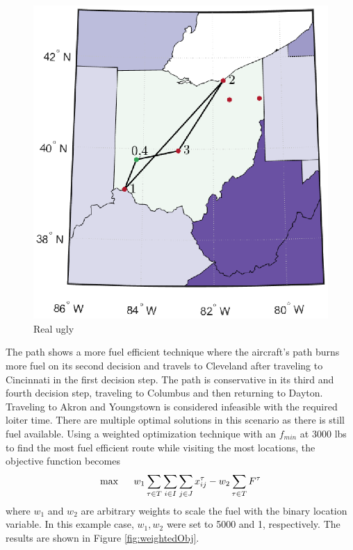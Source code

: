 \begin{figure}[H]
    \centering
    \includegraphics{Thesis/Method_II/fmin3000.eps}
    \caption{Real ugly}
    \label{fig:fmin3000}
\end{figure}
The path shows a more fuel efficient technique where the aircraft's path burns more fuel on its second decision and travels to Cleveland after traveling to Cincinnati in the first decision step. The path is conservative in its third and fourth decision step, traveling to Columbus and then returning to Dayton. Traveling to Akron and Youngstown is considered infeasible with the required loiter time. There are multiple optimal solutions in this scenario as there is still fuel available. Using a weighted optimization technique with an $f_{min}$ at $3000$ lbs to find the most fuel efficient route while visiting the most locations, the objective function becomes
\begin{equation}
    \max \hspace{.5cm} w_1\sum_{\tau\in T}\sum_{i\in I}\sum_{j\in J}x_{ij}^\tau-w_2\sum_{\tau\in T}F^\tau
\end{equation}
where $w_1$ and $w_2$ are arbitrary weights to scale the fuel with the binary location variable. In this example case, $w_1,w_2$ were set to 5000 and 1, respectively. The results are shown in Figure \ref{fig:weightedObj}.
